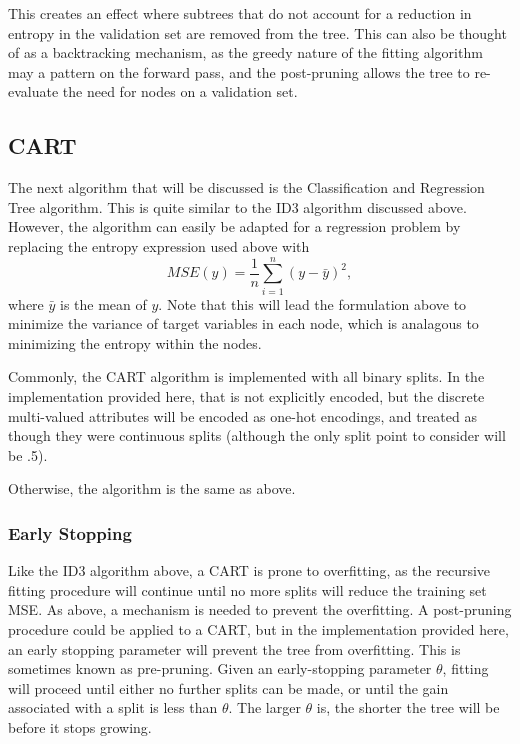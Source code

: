\documentclass{amsart}
\begin{document}
    This creates an effect where subtrees that do not account for a reduction in entropy in the validation set are
    removed from the tree. This can also be thought of as a backtracking mechanism, as the greedy nature
    of the fitting algorithm may a pattern on the forward pass, and the post-pruning allows the tree to
    re-evaluate the need for nodes on a validation set.

    \subsection{CART}
    The next algorithm that will be discussed is the Classification and Regression Tree algorithm\cite{cart}.
    This is quite similar to the ID3 algorithm discussed above. However, the algorithm
    can easily be adapted for a regression problem by replacing the entropy expression
    used above with
    \[
        MSE(y) = \frac{1}{n} \sum_{i=1}^n (y - \bar{y})^2,
    \]
    where $\bar{y}$ is the mean of $y$. Note that this will lead the formulation above
    to minimize the variance of target variables in each node, which is analagous
    to minimizing the entropy within the nodes.

    Commonly, the CART algorithm is implemented with all binary splits. In the implementation
    provided here, that is not explicitly encoded, but the discrete multi-valued
    attributes will be encoded as one-hot encodings, and treated as though they
    were continuous splits (although the only split point to consider will be .5).

    Otherwise, the algorithm is the same as above.

    \subsubsection{Early Stopping}
    Like the ID3 algorithm above, a CART is prone to overfitting, as the recursive fitting
    procedure will continue until no more splits will reduce the training set MSE.
    As above, a mechanism is needed to prevent the overfitting. A post-pruning
    procedure could be applied to a CART, but in the implementation provided here,
    an early stopping parameter will prevent the tree from overfitting. This is sometimes
    known as pre-pruning\cite{textbook}. Given an early-stopping parameter
    $\theta$, fitting will proceed until either no further splits can be made,
    or until the gain associated with a split is less than $\theta$. The
    larger $\theta$ is, the shorter the tree will be before it stops growing.
\end{document}
